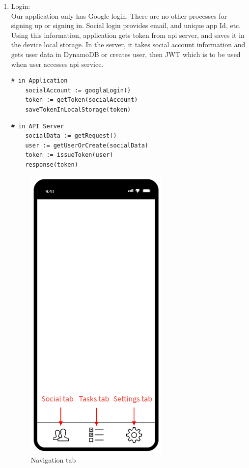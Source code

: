 \documentclass[conference]{IEEEtran}
\begin{document}
\begin{enumerate}
    \item Login: \\
    Our application only has Google login. There are no other processes for signing up or signing in. Social login provides email, and unique app Id, etc. Using this information, application gets token from api server, and saves it in the device local storage. In the server, it takes social account information and gets user data in DynamoDB or creates user, then JWT which is to be used when user accesses api service.
    \begin{lstlisting}[frame=single]
    # in Application
    socialAccount := googlaLogin()
    token := getToken(socialAccount)
    saveTokenInLocalStorage(token)
    \end{lstlisting}
    
    \begin{lstlisting}[frame=single]
    # in API Server
    socialData := getRequest()
    user := getUserOrCreate(socialData)
    token := issueToken(user)
    response(token)
    \end{lstlisting}
 
\begin{figure}[htp] \centering \includegraphics[width=200pt]{2) Navigation bar.PNG} \caption{Navigation tab} \label{fig:Navigation tab} \end{figure}
   

\end{enumerate}
\end{document}
